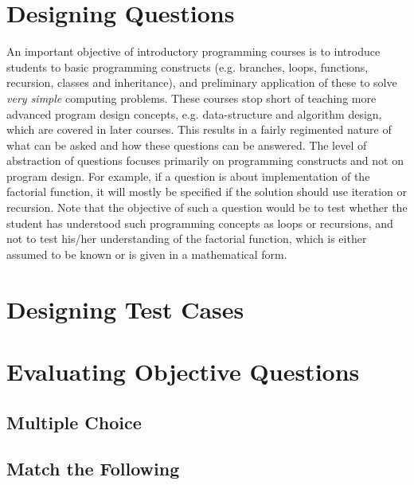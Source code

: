 \documentclass{article}
\begin{document}
\section{Designing Questions}
An important objective of introductory programming courses is to introduce students to basic programming constructs (e.g. branches, loops, functions, recursion, classes and inheritance), and preliminary application of these to solve \emph{very simple} computing problems. These courses stop short of teaching more advanced program design concepts, e.g. data-structure and algorithm design, which are covered in later courses. This results in a fairly regimented nature of what can be asked and how these questions can be answered. The level of abstraction of questions focuses primarily on programming constructs and not on program design. For example, if a question is about implementation of the factorial function, it will mostly be specified if the solution should use iteration or recursion. Note that the objective of such a question would be to test whether the student has understood such programming concepts as loops or recursions, and not to test his/her understanding of the factorial function, which is either assumed to be known or is given in a mathematical form.
\section{Designing Test Cases}

\section{Evaluating Objective Questions}

\subsection{Multiple Choice}

\subsection{Match the Following}
\end{document}
